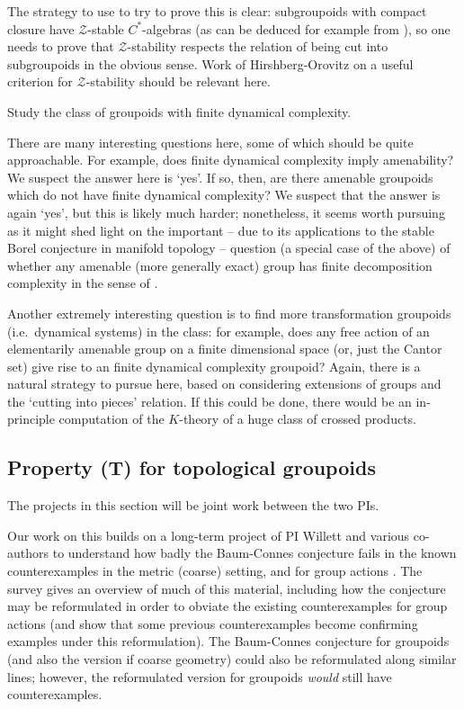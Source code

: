 The strategy to use to try to prove this is clear: subgroupoids with compact closure have $\mathcal{Z}$-stable $C^*$-algebras (as can be deduced for example from \cite{Winter:2004rb}), so one needs to prove that $\mathcal{Z}$-stability respects the relation of being cut into subgroupoids in the obvious sense.  Work of Hirshberg-Orovitz \cite{Hirshberg:2013aa} on a useful criterion for $\mathcal{Z}$-stability should be relevant here.


\begin{project}
Study the class of groupoids with finite dynamical complexity.
\end{project}

There are many interesting questions here, some of which should be quite approachable.  For example, does finite dynamical complexity imply amenability?  We suspect the answer here is `yes'.  If so, then, are there amenable groupoids which do not have finite dynamical complexity?  We suspect that the answer is again `yes', but this is likely much harder; nonetheless, it seems worth pursuing as it might shed light on the important -- due to its applications to the stable Borel conjecture in manifold topology -- question (a special case of the above) of whether any amenable (more generally exact) group has finite decomposition complexity in the sense of \cite{Guentner:2013aa}.

Another extremely interesting question is to find more transformation groupoids (i.e.\ dynamical systems) in the class: for example, does any free action of an elementarily amenable group on a finite dimensional space (or, just the Cantor set) give rise to an finite dynamical complexity groupoid?  Again, there is a natural strategy to pursue here, based on considering extensions of groups and the `cutting into pieces' relation.  If this could be done, there would be an in-principle computation of the $K$-theory of a huge class of crossed products.





\subsection{Property (T) for topological groupoids}\label{dydim}

The projects in this section will be joint work between the two PIs.

Our work on this builds on a long-term project of PI Willett and various co-authors to understand how badly the Baum-Connes conjecture fails \cite{Higson:2002la} in the known counterexamples in the metric (coarse) setting, and for group actions \cite{Willett:2010ud,Willett:2010zh,Baum:2013kx,Buss:2014aa}.  The survey \cite{Baum:2015le} gives an overview of much of this material, including how the conjecture may be reformulated in order to obviate the existing counterexamples for group actions (and show that some previous counterexamples become confirming examples under this reformulation).  The Baum-Connes conjecture for groupoids (and also the version if coarse geometry) could also be reformulated along similar lines; however, the reformulated version for groupoids \emph{would} still have counterexamples.

